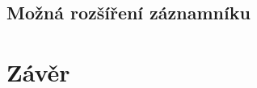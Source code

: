 
\section{Možná rozšíření záznamníku}
\label{mozne_rozsireni}

\chapter{Závěr}
\label{zaverPrace}



%
